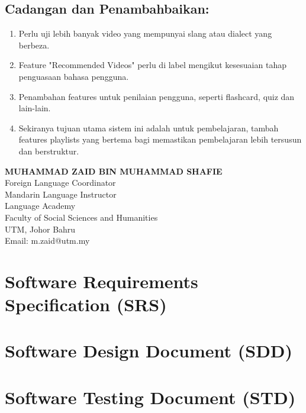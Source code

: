 \documentclass[oneside]{utmthesis}
\begin{document}
\section{Cadangan dan Penambahbaikan:}
\begin{enumerate}[label=\arabic*.]
    \item Perlu uji lebih banyak video yang mempunyai slang atau dialect yang berbeza.
    \item Feature "Recommended Videos" perlu di label mengikut kesesuaian tahap penguasaan bahasa pengguna.
    \item Penambahan features untuk penilaian pengguna, seperti flashcard, quiz dan lain-lain.
    \item Sekiranya tujuan utama sistem ini adalah untuk pembelajaran, tambah features playlists yang bertema bagi memastikan pembelajaran lebih tersusun dan berstruktur.
\end{enumerate}

\begin{flushleft}
    \textbf{MUHAMMAD ZAID BIN MUHAMMAD SHAFIE} \\
    Foreign Language Coordinator \\
    Mandarin Language Instructor \\
    Language Academy \\
    Faculty of Social Sciences and Humanities \\
    UTM, Johor Bahru \\
    Email: m.zaid@utm.my
\end{flushleft}



\chapter{Software Requirements Specification (SRS)}\label{app:srs}

\chapter{Software Design Document (SDD)}\label{app:sdd}

\chapter{Software Testing Document (STD)}\label{app:std}
% 
\hspace{\fill}


\endmatter
\end{document}
